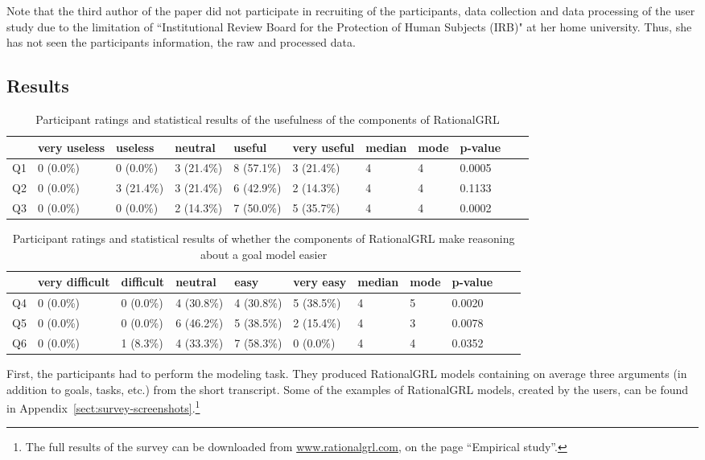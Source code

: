 Note that the third author of the paper did not participate in recruiting of the participants, data collection and data processing of the user study due to the limitation of ``Institutional Review Board for the Protection of Human Subjects (IRB)" at her home university. Thus, she has not seen the participants information, the raw and processed data.

\subsection{Results}\label{sec:survey:results}

\begin{table*}[t]
\centering
\begin{tabularx}{0.95\textwidth}{l|l|l|l|l|l||l|l|l|l|l}
& very useless & useless & neutral & useful & very useful & median & mode & p-value \\
\hline
Q1 & 0 (0.0\%) & 0 (0.0\%)  & 3 (21.4\%) & 8 (57.1\%) & 3 (21.4\%) & 4 & 4 & 0.0005 \\
Q2 & 0 (0.0\%) & 3 (21.4\%) & 3 (21.4\%) & 6 (42.9\%) & 2 (14.3\%) & 4 & 4 & 0.1133 \\
Q3 & 0 (0.0\%) & 0 (0.0\%)  & 2 (14.3\%) & 7 (50.0\%) & 5 (35.7\%) & 4 & 4 & 0.0002 
\end{tabularx}
\caption{Participant ratings and statistical results of the usefulness of the components of RationalGRL}
\label{table:survey:table2}
\end{table*}

\begin{table*}[t]
\centering
\begin{tabularx}{0.95\textwidth}{l|l|l|l|l|l||l|l|l|l|l}
& very difficult & difficult & neutral & easy & very easy & median & mode & p-value \\
\hline
Q4  & 0 (0.0\%) & 0 (0.0\%) & 4 (30.8\%) & 4 (30.8\%) & 5 (38.5\%) & 4 & 5 & 0.0020 \\
Q5  & 0 (0.0\%) & 0 (0.0\%) & 6 (46.2\%) & 5 (38.5\%) & 2 (15.4\%) & 4 & 3 & 0.0078\\
Q6 & 0 (0.0\%) & 1 (8.3\%) & 4 (33.3\%) & 7 (58.3\%) & 0 (0.0\%)  & 4 & 4 & 0.0352
\end{tabularx}
\caption{Participant ratings and statistical results of whether the components of RationalGRL make reasoning about a goal model easier}
\label{table:survey:table3}
\end{table*}

First, the participants had to perform the modeling task. They produced RationalGRL models containing on average three arguments (in addition to goals, tasks, etc.) from the short transcript. Some of the examples of RationalGRL models, created by the users, can be found in Appendix~\ref{sect:survey-screenshots}.\footnote{The full results of the survey can be downloaded from \url{www.rationalgrl.com}, on the page ``Empirical study''.}

